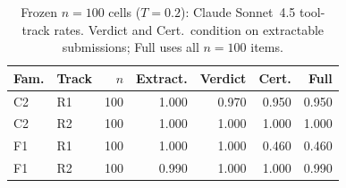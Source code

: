 \begin{table}[t]
  \centering
  \caption{Frozen $n{=}100$ cells ($T{=}0.2$): Claude Sonnet~4.5 tool-track rates. Verdict and Cert.\ condition on extractable submissions; Full uses all $n{=}100$ items.}
  \label{tab:claude-sonnet-tools-n100-summary}
  \setlength{\tabcolsep}{4pt}
  \begin{tabular}{@{}llrrrrr@{}}
    \toprule
    Fam. & Track & $n$ & Extract. & Verdict & Cert. & Full \\
    \midrule
    C2 & R1 & 100 & 1.000 & 0.970 & 0.950 & 0.950 \\
    C2 & R2 & 100 & 1.000 & 1.000 & 1.000 & 1.000 \\
    F1 & R1 & 100 & 1.000 & 1.000 & 0.460 & 0.460 \\
    F1 & R2 & 100 & 0.990 & 1.000 & 1.000 & 0.990 \\
    \bottomrule
  \end{tabular}
\end{table}

